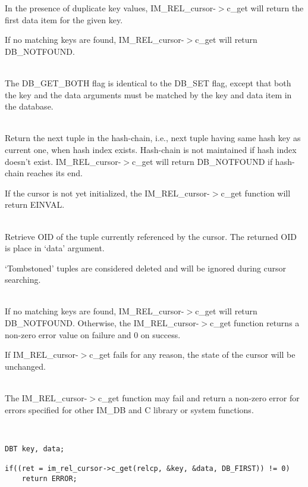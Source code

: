 \documentclass[11pt]{article}
\def\cdf{\sf }
\def\cdf{\sf }
\newcommand{\IMDB}{{\small{\cdf IM\_DB}}}
\newcommand{\IMRELcursor}{{\small{\cdf IM\_REL\_cursor}}}
\newcommand{\DBNOTFOUND}{{\small{\cdf DB\_NOTFOUND}}}
\newcommand{\DBGETBOTH}{{\small{\cdf DB\_GET\_BOTH}}}
\newcommand{\DBGETOIDOFKEY}{{\small{\cdf DB\_GET\_OIDOFKEY}}}
\newcommand{\DBNEXTDUP}{{\small{\cdf DB\_NEXT\_DUP}}}
\newcommand{\DBSET}{{\small{\cdf DB\_SET}}}
\begin{document}
\begin{description}
\begin{description}
    In the presence of duplicate key values, {\IMRELcursor}-$>$c\_get
    will return the first data item for the given key. 

    If no matching keys are found, {\IMRELcursor}-$>$c\_get will return
    {\DBNOTFOUND}.
  \item[{\DBGETBOTH}]\ \\
    The {\DBGETBOTH} flag is identical to the {\DBSET} flag, except
    that both the key and the data arguments must be matched by the
    key and data item in the database.
  \item[{\DBNEXTDUP}]\ \\
    Return the next tuple in the hash-chain, i.e., next tuple having
    same hash key as current one, when hash index exists.  Hash-chain
    is not maintained if hash index doesn't exist.
    {\IMRELcursor}-$>$c\_get will return {\DBNOTFOUND} if hash-chain
    reaches its end.

    If the cursor is not yet initialized, the {\IMRELcursor}-$>$c\_get
    function will return EINVAL.

  \item[{\DBGETOIDOFKEY}]\ \\
    Retrieve OID of the tuple currently referenced by the cursor.  The
    returned OID is place in `data' argument.
  \end{description}

  `Tombstoned' tuples are considered deleted and will be ignored
  during cursor searching.
\item[Return Value]\ \\
   If no matching keys are found, {\IMRELcursor}-$>$c\_get will return
   {\DBNOTFOUND}.  Otherwise, the {\IMRELcursor}-$>$c\_get function
   returns a non-zero error value on failure and 0 on success.

   If {\IMRELcursor}-$>$c\_get fails for any reason, the state of the
   cursor will be unchanged.

\item[Error]\ \\ 
The {\IMRELcursor}-$>$c\_get function may fail and return a non-zero
error for errors specified for other {\IMDB} and C library or system
functions.

\item[Sample Call]\ 
\begin{verbatim}
DBT key, data;

if((ret = im_rel_cursor->c_get(relcp, &key, &data, DB_FIRST)) != 0)
    return ERROR;
\end{verbatim}
\end{description}
\end{document}
